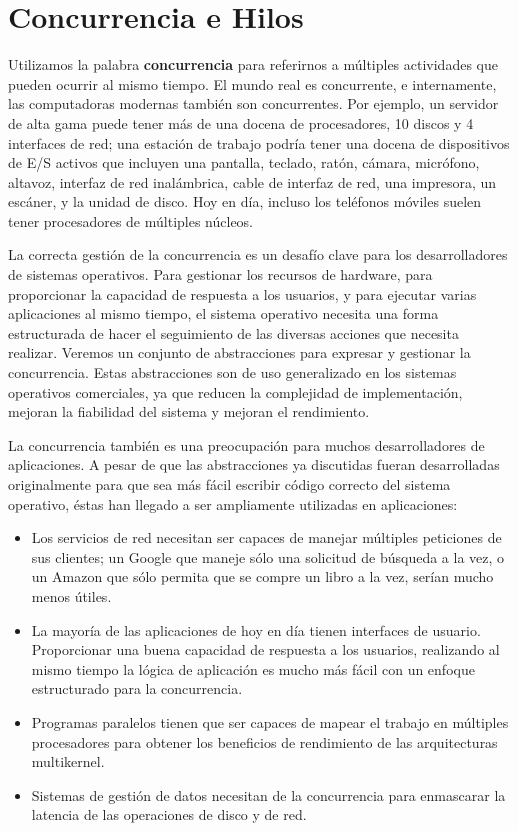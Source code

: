 \documentclass[10pt]{book}
\begin{document}
\chapter{Concurrencia e Hilos}
Utilizamos la palabra \textbf{concurrencia} para referirnos a múltiples actividades que pueden ocurrir al mismo tiempo. El mundo real es concurrente, e internamente, las computadoras modernas también son concurrentes. Por ejemplo, un servidor de alta gama puede tener más de una docena de procesadores, 10 discos y 4 interfaces de red; una estación de trabajo podría tener una docena de dispositivos de E/S activos que incluyen una pantalla, teclado, ratón, cámara, micrófono, altavoz, interfaz de red inalámbrica, cable de interfaz de red, una impresora, un escáner, y la unidad de disco. Hoy en día, incluso los teléfonos móviles suelen tener procesadores de múltiples núcleos.

La correcta gestión de la concurrencia es un desafío clave para los desarrolladores de sistemas operativos. Para gestionar los recursos de hardware, para proporcionar la capacidad de respuesta a los usuarios, y para ejecutar varias aplicaciones al mismo tiempo, el sistema operativo necesita una forma estructurada de hacer el seguimiento de las diversas acciones que necesita realizar. Veremos un conjunto de abstracciones para expresar y gestionar la concurrencia. Estas abstracciones son de uso generalizado en los sistemas operativos comerciales, ya que reducen la complejidad de implementación, mejoran la fiabilidad del sistema y mejoran el rendimiento.

La concurrencia también es una preocupación para muchos desarrolladores de aplicaciones. A pesar de que las abstracciones ya discutidas fueran desarrolladas originalmente para que sea más fácil escribir código correcto del sistema operativo, éstas han llegado a ser ampliamente utilizadas en aplicaciones:
\begin{itemize}
\item Los servicios de red necesitan ser capaces de manejar múltiples peticiones de sus clientes; un Google que maneje sólo una solicitud de búsqueda a la vez, o un Amazon que sólo permita que se compre un libro a la vez, serían mucho menos útiles.
\item La mayoría de las aplicaciones de hoy en día tienen interfaces de usuario. Proporcionar una buena capacidad de respuesta a los usuarios, realizando al mismo tiempo la lógica de aplicación es mucho más fácil con un enfoque estructurado para la concurrencia.
\item Programas paralelos tienen que ser capaces de mapear el trabajo en múltiples procesadores para obtener los beneficios de rendimiento de las arquitecturas multikernel.
\item Sistemas de gestión de datos necesitan de la concurrencia para enmascarar la latencia de las operaciones de disco y de red.
\end{itemize}
\end{document}
